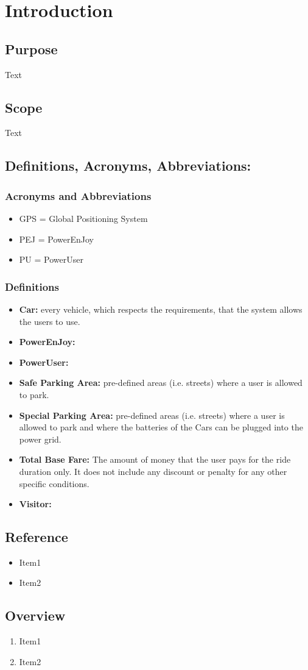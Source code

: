 \section{Introduction}
\subsection{Purpose}
Text
\subsection{Scope}
Text
\subsection{Definitions, Acronyms, Abbreviations:}
\subsubsection{Acronyms and Abbreviations}
\begin{itemize}
\item GPS = Global Positioning System
\item PEJ = PowerEnJoy
\item PU = PowerUser
\end{itemize}
\subsubsection{Definitions}
\begin{itemize}
\item \textbf{Car:} every vehicle, which respects the requirements, that the system allows the users to use.
\item \textbf{PowerEnJoy:}
\item \textbf{PowerUser:}
\item \textbf{Safe Parking Area:} pre-defined areas (i.e. streets) where a user is allowed to park.
\item \textbf{Special Parking Area:}  pre-defined areas (i.e. streets) where a user is allowed to park and where the batteries of the Cars can be plugged into the power grid.
\item \textbf{Total Base Fare:} The amount of money that the user pays for the ride duration only. It does not include any discount or penalty for any other specific conditions.
\item \textbf{Visitor:}
\end{itemize}
\subsection{Reference}
\begin{itemize}
\item Item1
\item Item2
\end{itemize}
\subsection{Overview}
\begin{enumerate}
\item Item1
\item Item2
\end{enumerate}